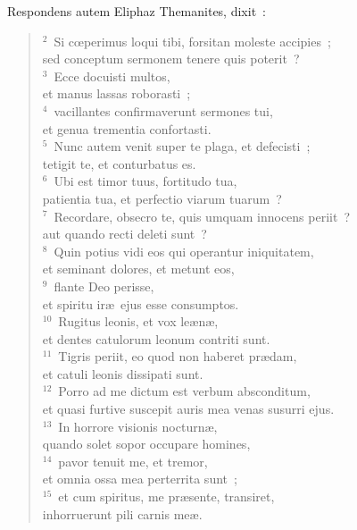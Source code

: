 \lettrine[lines=3,image=true,loversize=0.05,lraise=-0.03]{R}{}espondens autem Eliphaz Themanites, dixit~:
\begin{flushleft}\begin{verse}\vspace{6pt}${}^{2}$~Si cœperimus loqui tibi, forsitan moleste accipies~;\\ sed conceptum sermonem tenere quis poterit~?\\
${}^{3}$~Ecce docuisti multos,\\ et manus lassas roborasti~;\\
${}^{4}$~vacillantes confirmaverunt sermones tui,\\ et genua trementia confortasti.\\
${}^{5}$~Nunc autem venit super te plaga, et defecisti~;\\ tetigit te, et conturbatus es.\\
${}^{6}$~Ubi est timor tuus, fortitudo tua,\\ patientia tua, et perfectio viarum tuarum~?\\
${}^{7}$~Recordare, obsecro te, quis umquam innocens periit~?\\ aut quando recti deleti sunt~?\\
${}^{8}$~Quin potius vidi eos qui operantur iniquitatem,\\ et seminant dolores, et metunt eos,\\
${}^{9}$~flante Deo perisse,\\ et spiritu ir\ae\ ejus esse consumptos.\\
${}^{10}$~Rugitus leonis, et vox le\ae n\ae ,\\ et dentes catulorum leonum contriti sunt.\\
${}^{11}$~Tigris periit, eo quod non haberet pr\ae dam,\\ et catuli leonis dissipati sunt.\\
${}^{12}$~Porro ad me dictum est verbum absconditum,\\ et quasi furtive suscepit auris mea venas susurri ejus.\\
${}^{13}$~In horrore visionis nocturn\ae ,\\ quando solet sopor occupare homines,\\
${}^{14}$~pavor tenuit me, et tremor,\\ et omnia ossa mea perterrita sunt~;\\
${}^{15}$~et cum spiritus, me pr\ae sente, transiret,\\ inhorruerunt pili carnis me\ae .\\

\end{verse}
\end{flushleft}
